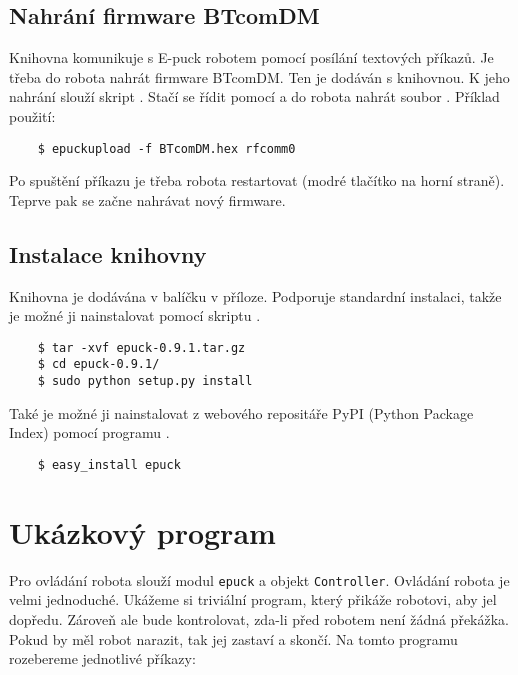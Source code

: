     \subsection{Nahrání firmware BTcomDM}

    Knihovna komunikuje s E-puck robotem pomocí posílání textových příkazů. Je
    třeba do robota nahrát firmware BTcomDM. Ten je dodáván s knihovnou.
    K jeho nahrání slouží skript  \cite{epuckupload}. Stačí
    se řídit pomocí  a do robota nahrát soubor .
    Příklad použití:

    \begin{verbatim}
    $ epuckupload -f BTcomDM.hex rfcomm0
    \end{verbatim}

    Po spuštění příkazu je třeba robota restartovat (modré tlačítko na horní
    straně). Teprve pak se začne nahrávat nový firmware.

    \subsection{Instalace knihovny}

    Knihovna je dodávána v balíčku v příloze. Podporuje standardní instalaci,
    takže je možné ji nainstalovat pomocí skriptu .

    \begin{verbatim}
    $ tar -xvf epuck-0.9.1.tar.gz
    $ cd epuck-0.9.1/
    $ sudo python setup.py install
    \end{verbatim}

    Také je možné ji nainstalovat z webového repositáře PyPI (Python Package
    Index) \cite{pypi} pomocí programu .

    \begin{verbatim}
    $ easy_install epuck
    \end{verbatim}

\section{Ukázkový program}
\label{ukazkovy_program}

    Pro ovládání robota slouží modul {\tt epuck} a objekt {\tt Controller}.
    Ovládání robota je velmi jednoduché. Ukážeme si triviální program, který
    přikáže robotovi, aby jel dopředu. Zároveň ale bude kontrolovat, zda-li
    před robotem není žádná překážka. Pokud by měl robot narazit, tak jej
    zastaví a skončí. Na tomto programu rozebereme jednotlivé příkazy:

